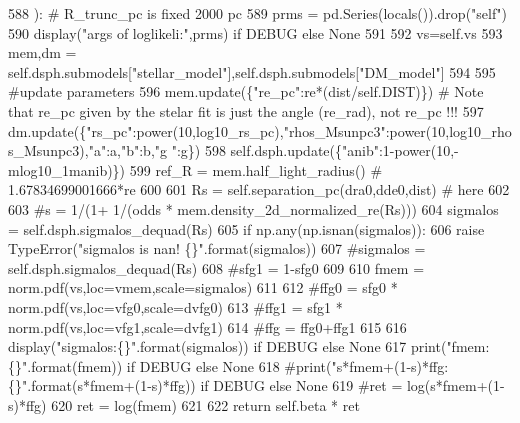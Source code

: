 \begin{DoxyCode}
588     ): \textcolor{comment}{# R\_trunc\_pc is fixed 2000 pc}
589         prms = pd.Series(locals()).drop(\textcolor{stringliteral}{"self"})
590         display(\textcolor{stringliteral}{"args of loglikeli:"},prms) \textcolor{keywordflow}{if} DEBUG \textcolor{keywordflow}{else} \textcolor{keywordtype}{None}
591         
592         vs=self.vs
593         mem,dm = self.dsph.submodels[\textcolor{stringliteral}{"stellar\_model"}],self.dsph.submodels[\textcolor{stringliteral}{"DM\_model"}]
594         
595         \textcolor{comment}{#update parameters}
596         mem.update(\{\textcolor{stringliteral}{"re\_pc"}:re*(dist/self.DIST)\}) \textcolor{comment}{# Note that re\_pc given by the stelar fit is just the
       angle (re\_rad), not re\_pc !!!}
597         dm.update(\{\textcolor{stringliteral}{"rs\_pc"}:power(10,log10\_rs\_pc),\textcolor{stringliteral}{"rhos\_Msunpc3"}:power(10,log10\_rhos\_Msunpc3),\textcolor{stringliteral}{"a"}:a,\textcolor{stringliteral}{"b"}:b,\textcolor{stringliteral}{"g
      "}:g\})
598         self.dsph.update(\{\textcolor{stringliteral}{"anib"}:1-power(10,-mlog10\_1manib)\})
599         ref\_R = mem.half\_light\_radius() \textcolor{comment}{# 1.67834699001666*re}
600         
601         Rs = self.separation\_pc(dra0,dde0,dist) \textcolor{comment}{# here }
602         
603         \textcolor{comment}{#s = 1/(1+ 1/(odds * mem.density\_2d\_normalized\_re(Rs)))}
604         sigmalos = self.dsph.sigmalos\_dequad(Rs)
605         \textcolor{keywordflow}{if} np.any(np.isnan(sigmalos)):
606             \textcolor{keywordflow}{raise} TypeError(\textcolor{stringliteral}{"sigmalos is nan! \{\}"}.format(sigmalos))
607         \textcolor{comment}{#sigmalos = self.dsph.sigmalos\_dequad(Rs)}
608         \textcolor{comment}{#sfg1 = 1-sfg0}
609         
610         fmem = norm.pdf(vs,loc=vmem,scale=sigmalos)
611         
612         \textcolor{comment}{#ffg0 = sfg0 * norm.pdf(vs,loc=vfg0,scale=dvfg0)}
613         \textcolor{comment}{#ffg1 = sfg1 * norm.pdf(vs,loc=vfg1,scale=dvfg1)}
614         \textcolor{comment}{#ffg = ffg0+ffg1}
615         
616         display(\textcolor{stringliteral}{"sigmalos:\{\}"}.format(sigmalos)) \textcolor{keywordflow}{if} DEBUG \textcolor{keywordflow}{else} \textcolor{keywordtype}{None}
617         print(\textcolor{stringliteral}{"fmem:\{\}"}.format(fmem)) \textcolor{keywordflow}{if} DEBUG \textcolor{keywordflow}{else} \textcolor{keywordtype}{None}
618         \textcolor{comment}{#print("s*fmem+(1-s)*ffg:\{\}".format(s*fmem+(1-s)*ffg)) if DEBUG else None}
619         \textcolor{comment}{#ret = log(s*fmem+(1-s)*ffg)}
620         ret = log(fmem)
621         
622         \textcolor{keywordflow}{return} self.beta * ret
\end{DoxyCode}
